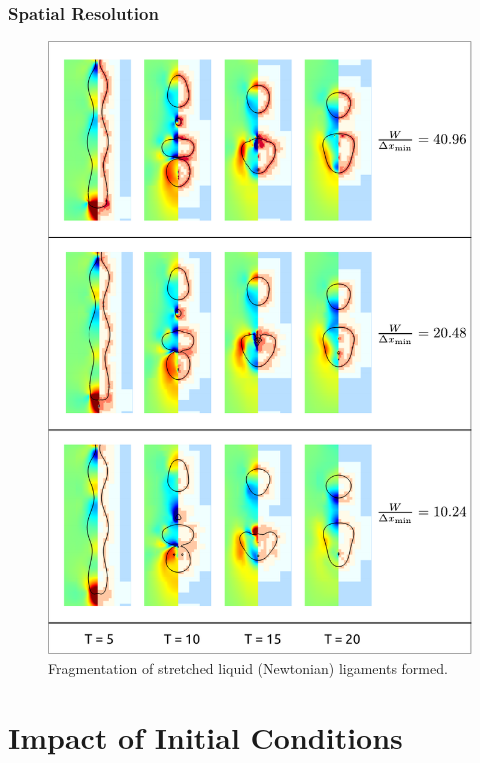 \subsubsection*{Spatial Resolution}


\begin{figure}
\centering
\includegraphics{plots/ligament_breakup/resolution_compare.pdf}
\caption{Fragmentation of stretched liquid (Newtonian) ligaments formed. 
	}
\label{res_comp}
\end{figure}



\section{Impact of Initial Conditions}




